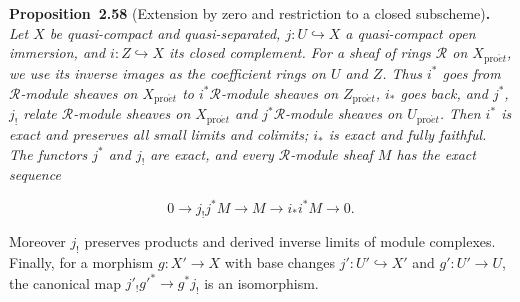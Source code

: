 \documentclass[11pt]{article}
\newenvironment{bpstatement}[2]{\par\addvspace{0.6\baselineskip}\noindent\textbf{#1}#2\textbf{.}\enspace\ignorespaces}
  {\par\addvspace{0.4\baselineskip}}
\newenvironment{bpstatementit}[2]{\begin{bpstatement}{#1}{#2}\itshape\ignorespaces}{\end{bpstatement}}
\begin{document}
\label{bp181}%
\begin{bpstatementit}{Proposition~2.58}{ (Extension by zero and restriction to a closed subscheme)}
Let \(X\) be quasi-compact and quasi-separated, \(j:U\hookrightarrow X\) a quasi-compact open immersion, and \(i:Z\hookrightarrow X\) its closed complement. For a sheaf of rings \(\mathcal R\) on \(X_{\mathrm{pro}\acute{e}t}\), we use its inverse images as the coefficient rings on \(U\) and \(Z\). Thus \(i^*\) goes from \(\mathcal R\)-module sheaves on \(X_{\mathrm{pro}\acute{e}t}\) to \(i^*\mathcal R\)-module sheaves on \(Z_{\mathrm{pro}\acute{e}t}\), \(i_*\) goes back, and \(j^*\), \(j_!\) relate \(\mathcal R\)-module sheaves on \(X_{\mathrm{pro}\acute{e}t}\) and \(j^*\mathcal R\)-module sheaves on \(U_{\mathrm{pro}\acute{e}t}\). Then \(i^*\) is exact and preserves all small limits and colimits; \(i_*\) is exact and fully faithful. The functors \(j^*\) and \(j_!\) are exact, and every \(\mathcal R\)-module sheaf \(M\) has the exact sequence

\[
0\longrightarrow j_!j^*M\longrightarrow M
\longrightarrow i_*i^*M\longrightarrow0.
\]

Moreover \(j_!\) preserves products and derived inverse limits of module complexes. Finally, for a morphism \(g:X'\to X\) with base changes \(j':U'\hookrightarrow X'\) and \(g':U'\to U\), the canonical map \(j'_!g'^*\to g^*j_!\) is an isomorphism.
\end{bpstatementit}
\end{document}
